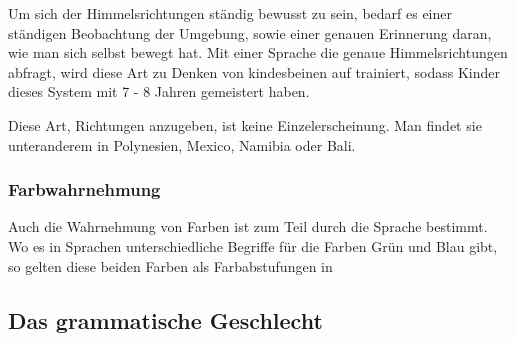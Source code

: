 \documentclass[12pt]{scrreprt}
\begin{document}
		Um sich der Himmelsrichtungen ständig bewusst zu sein, bedarf es einer ständigen
		Beobachtung der Umgebung, sowie einer genauen Erinnerung daran, wie man sich
		selbst bewegt hat. Mit einer Sprache die genaue Himmelsrichtungen abfragt,
		wird diese Art zu Denken von kindesbeinen auf trainiert, sodass Kinder dieses
		System mit 7 - 8 Jahren gemeistert haben.

		Diese Art, Richtungen anzugeben, ist keine Einzelerscheinung. Man findet sie
		unteranderem in Polynesien, Mexico, Namibia oder Bali.\autocite{article:Linguistic_Relativity}
		\subsubsection{Farbwahrnehmung}
		\label{sec:sawo_farbw}
		Auch die Wahrnehmung von Farben ist zum Teil durch die Sprache bestimmt.
		Wo es in Sprachen unterschiedliche Begriffe für die Farben Grün und Blau gibt,
		so gelten diese beiden Farben als Farbabstufungen in
		\subsection{Das grammatische Geschlecht}
		\label{sec:sawo_gramgeschlecht}

\printbibliography
\end{document}
